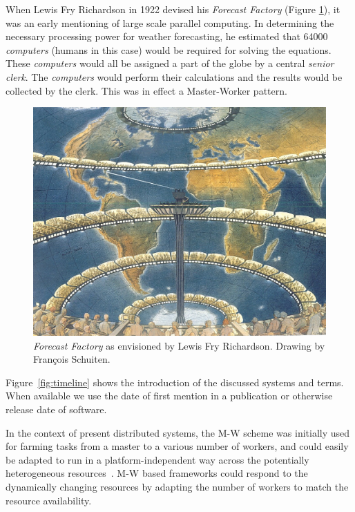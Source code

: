 \documentclass{sig-alternate}
\begin{document}

When Lewis Fry Richardson in 1922 devised his \textit{Forecast Factory} (Figure
\ref{fig:figures_forecast-factory}), it was an early mentioning of large scale
parallel computing.
In determining the necessary processing power for weather forecasting, he
estimated that 64000 \textit{computers} (humans in this case) would be required
for solving the equations.
These \textit{computers} would all be assigned a part of the globe by a central
\textit{senior clerk}.
The \textit{computers} would perform their calculations and the results would
be collected by the clerk.
This was in effect a Master-Worker pattern.

\begin{figure}[t]
	\centering
		\includegraphics[width=.45\textwidth]{figures/forecast-factory.jpg}
	\caption{\textit{Forecast Factory} as envisioned by Lewis Fry Richardson.
    Drawing by Fran{\c c}ois Schuiten.}
	\label{fig:figures_forecast-factory}
\end{figure}

Figure~\ref{fig:timeline} shows the introduction of the discussed systems and
terms. When available we use the date of first mention in a publication or
otherwise release date of software.

In the context of present distributed systems, the M-W scheme was initially
used for farming tasks from a master to a various number of workers, and could
easily be adapted to run in a platform-independent way across the potentially
heterogeneous resources~\cite{masterworker, Goux00anenabling}.
M-W based frameworks could respond to the dynamically changing resources by
adapting the number of workers to match the resource availability.
\end{document}
